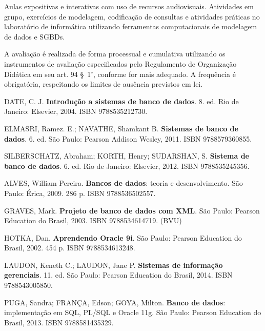 \begin{pud}
	
	\metodologia
	Aulas expositivas e interativas com uso de recursos audiovisuais. Atividades em grupo, exercícios de modelagem, codificação de consultas e atividades práticas no laboratório de informática utilizando ferramentas computacionais de modelagem de dados e SGBDs.


	\avaliacao
	A avaliação é realizada de forma processual e cumulativa utilizando os instrumentos de avaliação especificados pelo Regulamento de Organização Didática em seu art. 94 \S~1$^\circ$, conforme for mais adequado. A frequência é obrigatória, respeitando os limites de ausência previstos em lei.
	\naopresencial

	\begin{bibbasica}
			
        \item DATE, C. J. \textbf{Introdução a sistemas de banco de dados}. 8. ed. Rio de Janeiro: Elsevier, 2004. ISBN 9788535212730. 
		\item ELMASRI, Ramez. E.; NAVATHE, Shamkant B. \textbf{Sistemas de banco de dados}. 6. ed. São Paulo: Pearson Addison Wesley, 2011. ISBN 9788579360855. 
				\item SILBERSCHATZ, Abraham; KORTH, Henry; SUDARSHAN, S. \textbf{Sistema de banco de dados}. 6. ed. Rio de Janeiro: Elsevier, 2012. ISBN 9788535245356. 
		
	\end{bibbasica}
	
	\begin{bibcomplementar}
    
	    \item ALVES, William Pereira. \textbf{Bancos de dados}: teoria e desenvolvimento. São Paulo: Érica, 2009. 286 p. ISBN 9788536502557.
		\item GRAVES, Mark. \textbf{Projeto de banco de dados com XML}. São Paulo: Pearson Education do Brasil, 2003.  ISBN 9788534614719. (BVU)
		\item HOTKA, Dan. \textbf{Aprendendo Oracle 9i}. São Paulo: Pearson Education do Brasil, 2002. 454 p. ISBN 9788534613248.  
		\item LAUDON, Keneth C.; LAUDON, Jane P. \textbf{Sistemas de informação gerenciais}. 11. ed. São Paulo: Pearson Education do Brasil, 2014.  ISBN 9788543005850.  
		\item PUGA, Sandra; FRANÇA, Edson; GOYA, Milton. \textbf{Banco de dados}: implementação em SQL, PL/SQL e Oracle 11g. São Paulo: Pearson Education do Brasil, 2013. ISBN 9788581435329.  
		 
	\end{bibcomplementar}
		
\end{pud}

